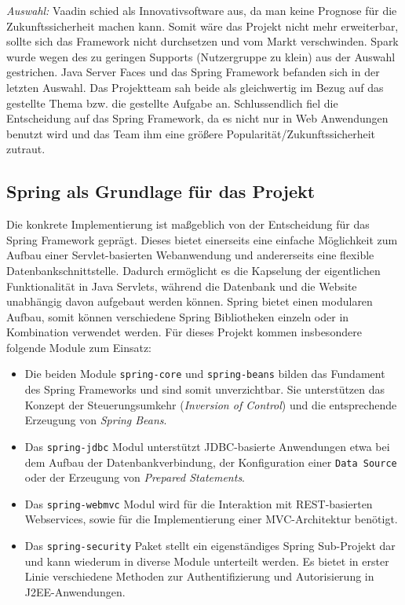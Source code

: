 \textit{Auswahl:} Vaadin schied als Innovativsoftware aus, da man keine Prognose für die Zukunftssicherheit machen kann. Somit wäre das Projekt nicht mehr erweiterbar, sollte sich das Framework nicht durchsetzen und vom Markt verschwinden. Spark wurde wegen des zu geringen Supports (Nutzergruppe zu klein) aus der Auswahl gestrichen. Java Server Faces und das Spring Framework befanden sich in der letzten Auswahl. Das Projektteam sah beide als gleichwertig im Bezug auf das gestellte Thema bzw. die gestellte Aufgabe an. Schlussendlich fiel die Entscheidung auf das Spring Framework, da es nicht nur in Web Anwendungen benutzt wird und das Team ihm eine größere Popularität/Zukunftssicherheit zutraut.

\subsection{Spring als Grundlage für das Projekt}

Die konkrete Implementierung ist maßgeblich von der Entscheidung für das Spring Framework
geprägt. Dieses bietet einerseits eine einfache Möglichkeit zum Aufbau einer Servlet-basierten
Webanwendung und andererseits eine flexible Datenbank­schnittstelle. Dadurch ermöglicht es
die Kapselung der eigentlichen Funktionalität in Java Servlets, während die Datenbank und die
Website unabhängig davon aufgebaut werden können. Spring bietet einen modularen Aufbau, somit können
verschiedene Spring Bibliotheken einzeln oder in Kombination verwendet werden. Für dieses Projekt kommen
insbesondere folgende Module zum Einsatz: \\
\begin{itemize}
	\item Die beiden Module \texttt{spring-core} und \texttt{spring-beans} bilden das Fundament des Spring Frameworks und sind somit unverzichtbar. Sie unterstützen das Konzept der Steuerungsumkehr (\textit{Inversion of Control}) und die entsprechende Erzeugung von \textit{Spring Beans}.
	\item Das \texttt{spring-jdbc} Modul unterstützt JDBC-basierte Anwendungen etwa bei dem Aufbau der Datenbankverbindung, der Konfiguration einer \texttt{Data Source} oder der Erzeugung von \textit{Prepared Statements}.
	\item Das \texttt{spring-webmvc} Modul wird für die Interaktion mit REST-basierten Webservices, sowie für die Implementierung einer \acs{MVC}-Architektur benötigt.
	\item Das \texttt{spring-security} Paket stellt ein eigenständiges Spring Sub-Projekt dar und kann wiederum in diverse Module unterteilt werden. Es bietet in erster Linie verschiedene Methoden zur Authentifizierung und Autorisierung in J2EE-Anwendungen.
\end{itemize}

